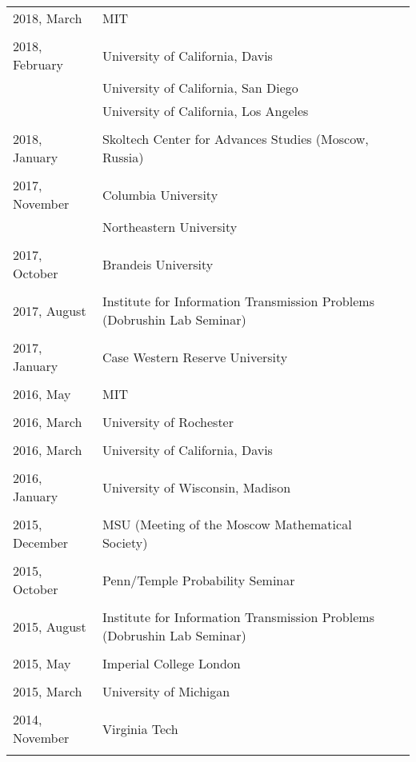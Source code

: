 \documentclass[letterpaper,11pt]{article}
\begin{document}
\begin{longtable}{llc}
	2018, March
	& MIT
	\\\\
	2018, February
	& University of California, Davis
	\\
	& University of California, San Diego
	\\
	& University of California, Los Angeles
	\\\\
	2018, January
	& Skoltech Center for Advances Studies (Moscow, Russia)
	\\\\
	2017, November
	& Columbia University
	\\
	& Northeastern University
	\\\\
	2017, October
	& Brandeis University
	\\\\
	2017, August
	& Institute for Information Transmission Problems
	(Dobrushin Lab Seminar)
	\\\\
	2017, January
	& Case Western Reserve University
	\\\\
	2016, May
	& MIT
	\\\\
	2016, March
	& University of Rochester
	\\\\
	2016, March
	& University of California, Davis
	\\\\
	2016, January
	& University of Wisconsin, Madison
	\\\\
	2015, December
	& MSU (Meeting of the Moscow Mathematical Society)
	\\\\
	2015, October
	& Penn/Temple Probability Seminar
	\\\\

	2015, August
	& Institute for Information Transmission Problems
	(Dobrushin Lab Seminar)
	\\\\

	2015, May
	& Imperial College London
	\\\\

	2015, March
	& University of Michigan
	\\\\

	2014, November
	& Virginia Tech\\\\


\end{longtable}
\end{document}
